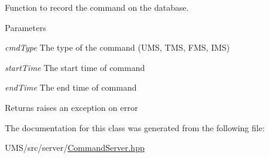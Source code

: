Function to record the command on the database. 


\begin{DoxyParams}{Parameters}
\item[{\em cmdType}]The type of the command (UMS, TMS, FMS, IMS) \item[{\em startTime}]The start time of command \item[{\em endTime}]The end time of command \end{DoxyParams}
\begin{DoxyReturn}{Returns}
raises an exception on error 
\end{DoxyReturn}


The documentation for this class was generated from the following file:\begin{DoxyCompactItemize}
\item 
UMS/src/server/\hyperlink{CommandServer_8hpp}{CommandServer.hpp}\end{DoxyCompactItemize}
